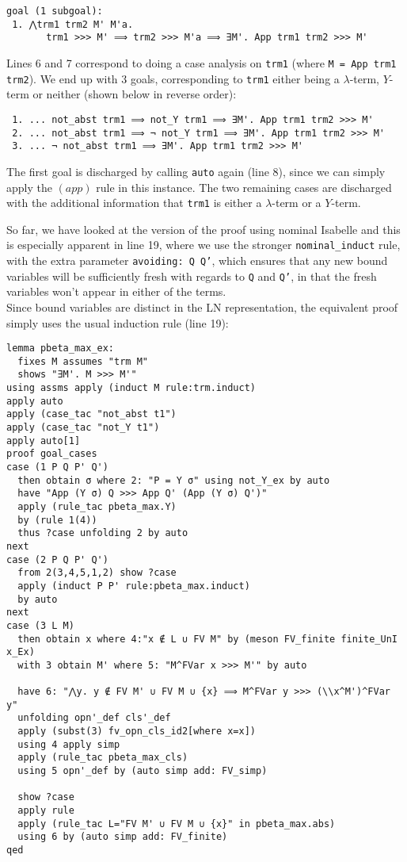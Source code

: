 \documentclass[a4paper, 12pt, twoside]{style/ociamthesis}
\theoremstyle{plain}
\theoremstyle{definition}
\theoremstyle{remark}
\begin{document}
\begin{verbatim}
goal (1 subgoal):
 1. ⋀trm1 trm2 M' M'a.
       trm1 >>> M' ⟹ trm2 >>> M'a ⟹ ∃M'. App trm1 trm2 >>> M'
\end{verbatim}

Lines 6 and 7 correspond to doing a case analysis on \texttt{trm1}
(where \texttt{M = App trm1 trm2}). We end up with 3 goals,
corresponding to \texttt{trm1} either being a \(\lambda\)-term,
\(Y\)-term or neither (shown below in reverse order):

\begin{verbatim}
 1. ... not_abst trm1 ⟹ not_Y trm1 ⟹ ∃M'. App trm1 trm2 >>> M'
 2. ... not_abst trm1 ⟹ ¬ not_Y trm1 ⟹ ∃M'. App trm1 trm2 >>> M'
 3. ... ¬ not_abst trm1 ⟹ ∃M'. App trm1 trm2 >>> M'
\end{verbatim}

The first goal is discharged by calling \texttt{auto} again (line 8),
since we can simply apply the \((app)\) rule in this instance. The two
remaining cases are discharged with the additional information that
\texttt{trm1} is either a \(\lambda\)-term or a \(Y\)-term.

So far, we have looked at the version of the proof using nominal
Isabelle and this is especially apparent in line 19, where we use the
stronger \texttt{nominal\_induct} rule, with the extra parameter
\texttt{avoiding: Q Q'}, which ensures that any new bound variables will
be sufficiently fresh with regards to \texttt{Q} and \texttt{Q'}, in
that the fresh variables won't appear in either of the terms.\\
Since bound variables are distinct in the LN representation, the
equivalent proof simply uses the usual induction rule (line 19):

\begin{verbatim}
lemma pbeta_max_ex:
  fixes M assumes "trm M"
  shows "∃M'. M >>> M'"
using assms apply (induct M rule:trm.induct)
apply auto
apply (case_tac "not_abst t1")
apply (case_tac "not_Y t1")
apply auto[1]
proof goal_cases
case (1 P Q P' Q')
  then obtain σ where 2: "P = Y σ" using not_Y_ex by auto
  have "App (Y σ) Q >>> App Q' (App (Y σ) Q')"
  apply (rule_tac pbeta_max.Y)
  by (rule 1(4))
  thus ?case unfolding 2 by auto
next
case (2 P Q P' Q')
  from 2(3,4,5,1,2) show ?case
  apply (induct P P' rule:pbeta_max.induct)
  by auto
next
case (3 L M)
  then obtain x where 4:"x ∉ L ∪ FV M" by (meson FV_finite finite_UnI x_Ex)
  with 3 obtain M' where 5: "M^FVar x >>> M'" by auto

  have 6: "⋀y. y ∉ FV M' ∪ FV M ∪ {x} ⟹ M^FVar y >>> (\\x^M')^FVar y"
  unfolding opn'_def cls'_def 
  apply (subst(3) fv_opn_cls_id2[where x=x])
  using 4 apply simp
  apply (rule_tac pbeta_max_cls)
  using 5 opn'_def by (auto simp add: FV_simp)

  show ?case
  apply rule
  apply (rule_tac L="FV M' ∪ FV M ∪ {x}" in pbeta_max.abs)
  using 6 by (auto simp add: FV_finite)
qed
\end{verbatim}
\end{document}
